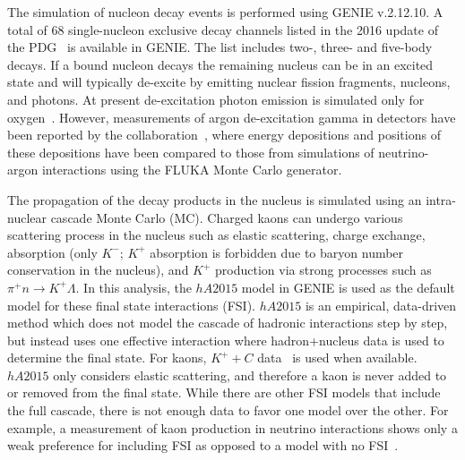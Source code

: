 The simulation of nucleon decay events is performed using GENIE v.2.12.10. 
A total of 68 single-nucleon exclusive decay channels listed in the 2016 update of the PDG~\cite{Patrignani:2016xqp} is available in GENIE. The list includes two-, three- and five-body decays. 
If a bound nucleon decays the remaining nucleus can be in an excited state and will typically de-excite by emitting nuclear fission fragments, nucleons, and photons. At present de-excitation photon emission is simulated only for oxygen~\cite{Andreopoulos:2015wxa}.  However, measurements of argon de-excitation gamma in \lartpc detectors have been reported by the \argoneut collaboration~\cite{Acciarri:2018myr},
where energy depositions and positions of these depositions have been compared to those from simulations of neutrino-argon interactions using the FLUKA Monte Carlo generator.

The propagation of the decay products in the nucleus is simulated using an intra-nuclear cascade Monte Carlo (MC). 
Charged kaons can undergo various scattering process in the nucleus such as elastic scattering, charge exchange, absorption (only $K^{-}$; $K^{+}$ absorption is forbidden due to baryon number conservation in the nucleus), and $K^{+}$ production via strong processes such as $\pi^{+}n \rightarrow K^{+} \Lambda$.  In this analysis, the $hA2015$ model in GENIE is used as the default model for these final state interactions (FSI).  $hA2015$ is an empirical, data-driven method which does not model the cascade of hadronic interactions step by step, but instead uses one effective interaction where hadron+nucleus data is used to determine the final state.
For kaons, $K^{+}+C$ data~\cite{Bugg:1968zz,Friedman:1997eq}
is used when available. $hA2015$ only considers elastic scattering, and therefore a kaon is never added to or removed from the final state. While there are other FSI models that include the full cascade, there is not enough data to favor one model over the other.  For example, a measurement of kaon production in neutrino interactions shows only a weak preference for including FSI as opposed to a model with no FSI~\cite{Marshall:2016rrn}.

